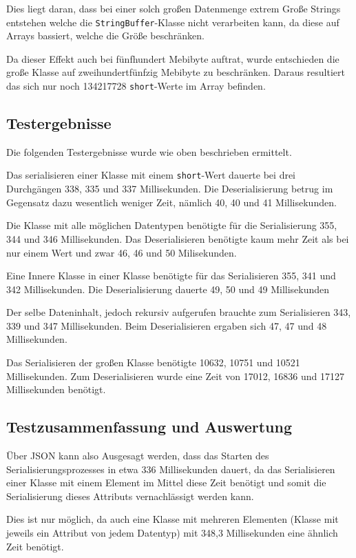 Dies liegt daran, dass bei einer solch gro\ss{}en Datenmenge extrem Gro\ss{}e Strings entstehen welche die \texttt{StringBuffer}-Klasse nicht verarbeiten kann, da diese auf Arrays bassiert, welche die Gr\"o\ss{}e beschr\"anken.

Da dieser Effekt auch bei f\"unfhundert Mebibyte auftrat, wurde entschieden die gro\ss{}e Klasse auf zweihundertf\"unfzig Mebibyte zu beschr\"anken. Daraus resultiert das sich nur noch 134217728 \texttt{short}-Werte im Array befinden.

\subsection{Testergebnisse}
Die folgenden Testergebnisse wurde wie oben beschrieben ermittelt.

Das serialisieren einer Klasse mit einem \texttt{short}-Wert dauerte bei drei Durchg\"angen 338, 335 und 337 Millisekunden. Die Deserialisierung betrug im Gegensatz dazu wesentlich weniger Zeit, n\"amlich 40, 40 und 41 Millisekunden. 

Die Klasse mit alle m\"oglichen Datentypen ben\"otigte f\"ur die Serialisierung  355, 344 und 346 Millisekunden. Das Deserialisieren ben\"otigte kaum mehr Zeit als bei nur einem Wert und zwar 46, 46 und 50 Milisekunden.

Eine Innere Klasse in einer Klasse ben\"otigte f\"ur das Serialisieren 355, 341 und 342 Millisekunden. Die Deserialisierung dauerte 49, 50 und 49 Millisekunden

Der selbe Dateninhalt, jedoch rekursiv aufgerufen brauchte zum Serialisieren 343, 339 und 347 Millisekunden. Beim Deserialisieren ergaben sich 47, 47 und 48 Millisekunden.

Das Serialisieren der gro\ss{}en Klasse ben\"otigte 10632, 10751 und 10521 Millisekunden. Zum Deserialisieren wurde eine Zeit von 17012, 16836 und 17127 Millisekunden ben\"otigt.

\subsection{Testzusammenfassung und Auswertung}
\"Uber JSON kann also Ausgesagt werden, dass das Starten des Serialisierungsprozesses in etwa 336 Millisekunden dauert, da das Serialisieren einer Klasse mit einem Element im Mittel diese Zeit ben\"otigt und somit die Serialisierung dieses Attributs vernachl\"assigt werden kann.

Dies ist nur m\"oglich, da auch eine Klasse mit mehreren Elementen (Klasse mit jeweils ein Attribut von jedem Datentyp) mit 348,3 Millisekunden eine \"ahnlich Zeit ben\"otigt.

